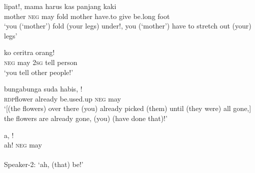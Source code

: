 \ea
\label{Example_13.74}
 {} {} {lipat!,} {mama} {harus} {kas} {panjang} {kaki}\\ %
 mother  \textsc{neg}  may  fold  mother  have.to  give  be.long  foot\\
 ‘you (‘mother’)  fold (your legs) under!, you (‘mother’) have to stretch out (your) legs’ \textstyleExampleSource{[080921-004a-CvNP.0069]}
\z

\ea
\label{Example_13.75}
 {} {ko} {ceritra} {orang!}\\ %
 \textsc{neg}  may  \textsc{2sg}  tell  person\\
\glt 
‘you \bluebold{)} tell other people!’ \textstyleExampleSource{[081110-008-CvNP.0072]}
\z

\ea
\label{Example_13.76}
\gll {\ldots} {bunga{\Tilde}bunga} {suda} {habis,} {} {!}\\ %
  {} \textsc{rdp}{\Tilde}flower  already  be.used.up  \textsc{neg}  may\\
 ‘[(the flowers) over there (you) already picked (them) until (they were) all gone,] the flowers are already gone, (you)  (have done that)!’ \textstyleExampleSource{[081006-021-CvHt.0001]}
\z

\ea
\label{Example_13.77}
 {a,} {} {!}\\ %
 {}  ah!  \textsc{neg}  may\\
\\
Speaker-2: ‘ah, (that)  be!’ \textstyleExampleSource{[080917-002-Cv.0015-0016]}
\z

